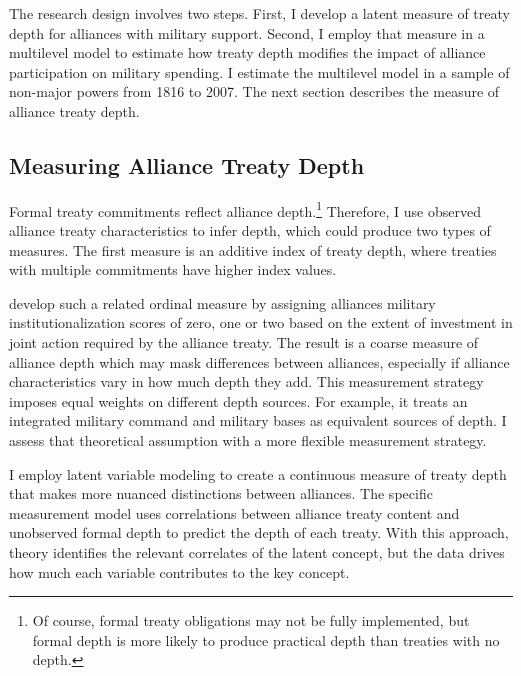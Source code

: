 \documentclass[12pt]{article}
\begin{document}
The research design involves two steps. 
First, I develop a latent measure of treaty depth for alliances with military support. 
Second, I employ that measure in a multilevel model to estimate how treaty depth modifies the impact of alliance participation on military spending. 
I estimate the multilevel model in a sample of non-major powers from 1816 to 2007. 
The next section describes the measure of alliance treaty depth. 


\subsection{Measuring Alliance Treaty Depth} 


Formal treaty commitments reflect alliance depth.\footnote{Of course, formal treaty obligations may not be fully implemented, but formal depth is more likely to produce practical depth than treaties with no depth.}
Therefore, I use observed alliance treaty characteristics to infer depth, which could produce two types of measures. 
The first measure is an additive index of treaty depth, where treaties with multiple commitments have higher index values. 


\citep{LeedsAnac2005} develop such a related ordinal measure by assigning alliances military institutionalization scores of zero, one or two based on the extent of investment in joint action required by the alliance treaty. 
The result is a coarse measure of alliance depth which may mask differences between alliances, especially if alliance characteristics vary in how much depth they add. 
This measurement strategy imposes equal weights on different depth sources.
For example, it treats an integrated military command and military bases as equivalent sources of depth. 
I assess that theoretical assumption with a more flexible measurement strategy.
 
 
I employ latent variable modeling to create a continuous measure of treaty depth that makes more nuanced distinctions between alliances.
The specific measurement model uses correlations between alliance treaty content and unobserved formal depth to predict the depth of each treaty. 
With this approach, theory identifies the relevant correlates of the latent concept, but the data drives how much each variable contributes to the key concept. 
\end{document}
